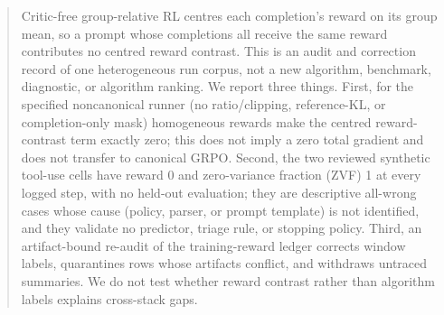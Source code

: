 \begin{abstract}
Critic-free group-relative RL centres each completion's reward on its group
mean, so a prompt whose completions all receive the same reward contributes no
centred reward contrast. This is an audit and correction record of one
heterogeneous run corpus, not a new algorithm, benchmark, diagnostic, or
algorithm ranking. We report three things. First, for the specified
noncanonical runner (no ratio/clipping, reference-KL, or completion-only mask)
homogeneous rewards make the centred reward-contrast term exactly zero; this
does not imply a zero total gradient and does not transfer to canonical GRPO.
Second, the two reviewed synthetic tool-use cells have reward 0 and
zero-variance fraction (ZVF) 1 at every logged step, with no held-out
evaluation; they are descriptive all-wrong cases whose cause (policy, parser,
or prompt template) is not identified, and they validate no predictor,
triage rule, or stopping policy. Third, an artifact-bound re-audit of the
training-reward ledger corrects window labels, quarantines rows whose
artifacts conflict, and withdraws untraced summaries. We do not test whether
reward contrast rather than algorithm labels explains cross-stack gaps.
\end{abstract}
